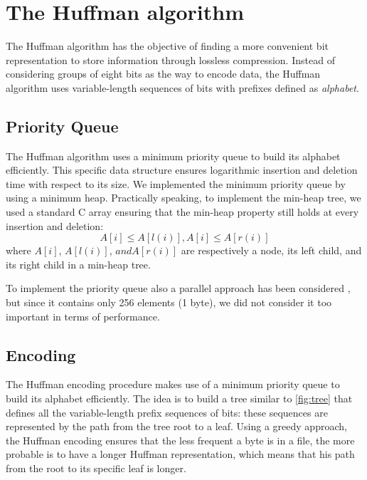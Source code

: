 \section{The Huffman algorithm}
The Huffman algorithm has the objective of finding a more convenient bit representation to store information through lossless compression. Instead of considering groups of eight bits as the way to encode data, the Huffman algorithm uses variable-length sequences of bits with prefixes defined as \emph{alphabet}.

\subsection{Priority Queue}
The Huffman algorithm uses a minimum priority queue to build its alphabet efficiently. This specific data structure ensures logarithmic insertion and deletion time with respect to its size.
We implemented the minimum priority queue by using a minimum heap. Practically speaking, to implement the min-heap tree, we used a standard C array ensuring that the min-heap property still holds at every insertion and deletion:
\begin{equation}
    A[i] \le A[l(i)], A[i] \le A[r(i)]
\end{equation}
where \(A[i]\), \(A[l(i)]\), \(and A[r(i)]\) are respectively a node, its left child, and its right child in a min-heap tree.

To implement the priority queue also a parallel approach has been considered \cite{BRODAL19984}, but since it contains only 256 elements (1 byte), we did not consider it too important in terms of performance.

\subsection{Encoding}
The Huffman encoding procedure makes use of a minimum priority queue to build its alphabet efficiently. The idea is to build a tree similar to \cref{fig:tree} that defines all the variable-length prefix sequences of bits: these sequences are represented by the path from the tree root to a leaf. Using a greedy approach, the Huffman encoding ensures that the less frequent a byte is in a file, the more probable is to have a longer Huffman representation, which means that his path from the root to its specific leaf is longer.

